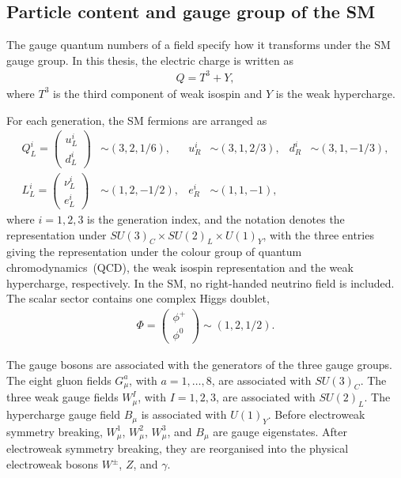 \subsection{Particle content and gauge group of the SM}
\label{subsec:sm_particle_content}

The gauge quantum numbers of a field specify how it transforms under the SM gauge group. 
In this thesis, the electric charge is written as
\begin{align}
    Q = T^{3} + Y,
    \label{eq:electric_charge_relation}
\end{align}
where $T^{3}$ is the third component of weak isospin and $Y$ is the weak hypercharge.

For each generation, the SM fermions are arranged as
\begin{align*}
    Q_{L}^{i}
    =
    \begin{pmatrix}
        u_{L}^{i} \\
        d_{L}^{i}
    \end{pmatrix}
    &\sim
    (3,2,1/6),
    &
    u_{R}^{i}
    &\sim
    (3,1,2/3),
    &
    d_{R}^{i}
    &\sim
    (3,1,-1/3),
    \\
    L_{L}^{i}
    =
    \begin{pmatrix}
        \nu_{L}^{i} \\
        e_{L}^{i}
    \end{pmatrix}
    &\sim
    (1,2,-1/2),
    &
    e_{R}^{i}
    &\sim
    (1,1,-1),
\end{align*}
where $i=1,2,3$ is the generation index, and the notation denotes the representation under
$SU(3)_{C}\times SU(2)_{L}\times U(1)_{Y}$, with the three entries giving the representation under the colour group of quantum chromodynamics~(QCD), the weak isospin representation and the weak hypercharge, respectively.
In the SM, no right-handed neutrino field is included. 
The scalar sector contains one complex Higgs doublet,
\begin{align*}
    \Phi
    =
    \begin{pmatrix}
        \phi^{+} \\
        \phi^{0}
    \end{pmatrix}
    \sim
    (1,2,1/2).
\end{align*}

The gauge bosons are associated with the generators of the three gauge groups. 
The eight gluon fields $G_{\mu}^{a}$, with $a=1,\ldots,8$, are associated with $SU(3)_{C}$. 
The three weak gauge fields $W_{\mu}^{I}$, with $I=1,2,3$, are associated with $SU(2)_{L}$. 
The hypercharge gauge field $B_{\mu}$ is associated with $U(1)_{Y}$. 
Before electroweak symmetry breaking, $W_{\mu}^{1}$, $W_{\mu}^{2}$, $W_{\mu}^{3}$, and $B_{\mu}$ are gauge eigenstates. 
After electroweak symmetry breaking, they are reorganised into the physical electroweak bosons $W^{\pm}$, $Z$, and $\gamma$.

